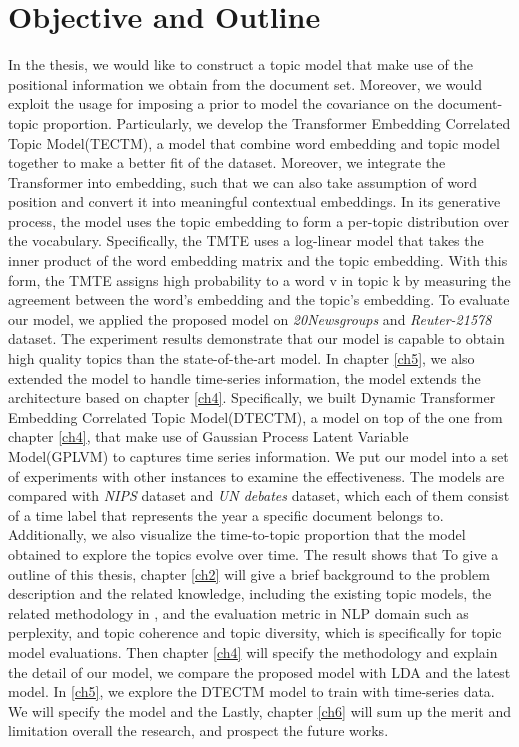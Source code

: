 \section{Objective and Outline}\label{ch1:4}
In the thesis, we would like to construct a topic model that make use of the positional information we obtain from the document set. Moreover, we would exploit the usage for imposing a prior to model the covariance on the document-topic proportion.
Particularly, we develop the Transformer Embedding Correlated Topic Model(TECTM), a model that combine word embedding and topic model together to make a better fit of the dataset. Moreover, we integrate the Transformer into embedding, such that we can also take assumption of word position and convert it into meaningful contextual embeddings.
In its generative process, the model uses the topic embedding to form a per-topic distribution over the vocabulary. Specifically, the TMTE uses a log-linear model that takes the inner product of the word embedding matrix and the topic embedding.
With this form, the TMTE assigns high probability to a word v in topic k by measuring the agreement between the word’s embedding and the topic’s embedding.
To evaluate our model, we applied the proposed model on \textit{20Newsgroups} and \textit{Reuter-21578} dataset. The experiment results demonstrate that our model is capable to obtain high quality topics than the state-of-the-art model. 
In chapter \ref{ch5}, we also extended the model to handle time-series information, the model extends the architecture based on chapter \ref{ch4}.
Specifically, we built Dynamic Transformer Embedding Correlated Topic Model(DTECTM), a model on top of the one from chapter \ref{ch4}, that make use of Gaussian Process Latent Variable Model(GPLVM) to captures time series information. 
We put our model into a set of experiments with other instances to examine the effectiveness. The models are compared with \textit{NIPS} dataset and \textit{UN debates} dataset, which each of them consist of a time label that represents the year a specific document belongs to.
Additionally, we also visualize the time-to-topic proportion that the model obtained to explore the topics evolve over time. 
The result shows that 
To give a outline of this thesis, chapter \ref{ch2} will give a brief background to the problem description and the related knowledge, including the existing topic models, the related methodology in  , and the evaluation metric in NLP domain such as perplexity, and topic coherence and topic diversity, which is specifically for topic model evaluations.
Then chapter \ref{ch4} will specify the methodology and explain the detail of our model, we compare the proposed model with LDA and the latest model. 
In \ref{ch5}, we explore the DTECTM model to train with time-series data. We will specify the model and the 
Lastly, chapter \ref{ch6} will sum up the merit and limitation overall the research, and prospect the future works.
